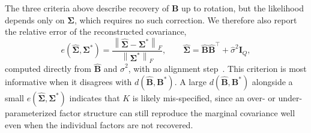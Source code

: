 The three criteria above describe recovery of $\mathbf{B}$ up to rotation, but the likelihood depends only on $\bm{\Sigma}$, which requires no such correction. We therefore also report the relative error of the reconstructed covariance,
\begin{equation}
    e(\hat{\bm{\Sigma}}, \bm{\Sigma}^{*}) = \frac{\left\|\hat{\bm{\Sigma}} - \bm{\Sigma}^{*}\right\|_F}{\left\|\bm{\Sigma}^{*}\right\|_F}, \qquad \hat{\bm{\Sigma}} = \hat{\mathbf{B}}\hat{\mathbf{B}}^\top + \hat\sigma^2\mathbf{I}_Q,
    \label{eq:e-Sigma-error}
\end{equation}
computed directly from $\hat{\mathbf{B}}$ and $\hat\sigma^2$, with no alignment step~\citep{Fan2013}. This criterion is most informative when it disagrees with $d(\hat{\mathbf{B}}, \mathbf{B}^{*})$. A large $d(\hat{\mathbf{B}}, \mathbf{B}^{*})$ alongside a small $e(\hat{\bm{\Sigma}}, \bm{\Sigma}^{*})$ indicates that $K$ is likely mis-specified, since an over- or under-parameterized factor structure can still reproduce the marginal covariance well even when the individual factors are not recovered.

